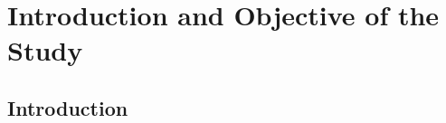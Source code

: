 \chapter{Introduction and Objective of the Study}

\section{Introduction}\label{sec:Introduction}



